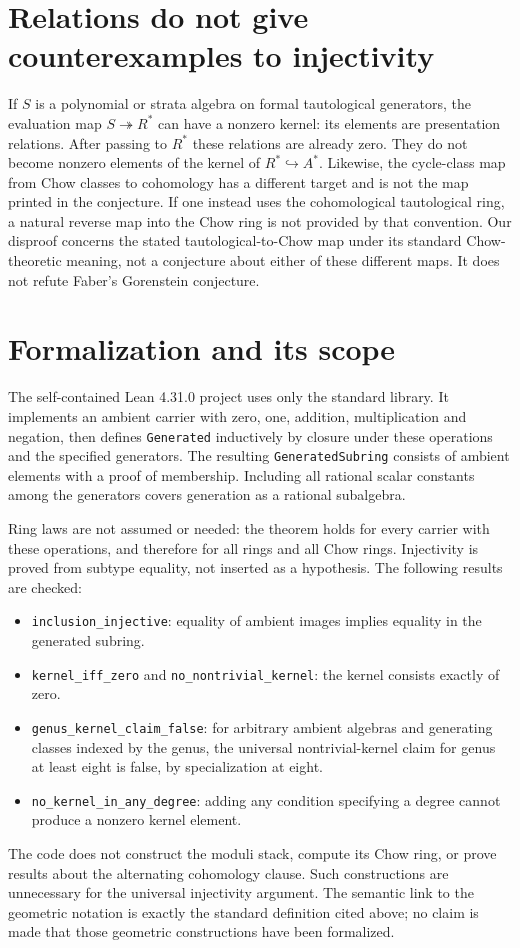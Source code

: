 \documentclass[11pt]{article}
\begin{document}
\section{Relations do not give counterexamples to injectivity}
If $S$ is a polynomial or strata algebra on formal tautological generators, the evaluation map $S\twoheadrightarrow R^*$ can have a nonzero kernel: its elements are presentation relations. After passing to $R^*$ these relations are already zero. They do not become nonzero elements of the kernel of $R^*\hookrightarrow A^*$.
Likewise, the cycle-class map from Chow classes to cohomology has a different target and is not the map printed in the conjecture. If one instead uses the cohomological tautological ring, a natural reverse map into the Chow ring is not provided by that convention. Our disproof concerns the stated tautological-to-Chow map under its standard Chow-theoretic meaning, not a conjecture about either of these different maps. It does not refute Faber's Gorenstein conjecture.

\section{Formalization and its scope}
The self-contained Lean 4.31.0 project uses only the standard library. It implements an ambient carrier with zero, one, addition, multiplication and negation, then defines \texttt{Generated} inductively by closure under these operations and the specified generators. The resulting \texttt{GeneratedSubring} consists of ambient elements with a proof of membership. Including all rational scalar constants among the generators covers generation as a rational subalgebra.

Ring laws are not assumed or needed: the theorem holds for every carrier with these operations, and therefore for all rings and all Chow rings. Injectivity is proved from subtype equality, not inserted as a hypothesis. The following results are checked:
\begin{itemize}
\item \texttt{inclusion\_injective}: equality of ambient images implies equality in the generated subring.
\item \texttt{kernel\_iff\_zero} and \texttt{no\_nontrivial\_kernel}: the kernel consists exactly of zero.
\item \texttt{genus\_kernel\_claim\_false}: for arbitrary ambient algebras and generating classes indexed by the genus, the universal nontrivial-kernel claim for genus at least eight is false, by specialization at eight.
\item \texttt{no\_kernel\_in\_any\_degree}: adding any condition specifying a degree cannot produce a nonzero kernel element.
\end{itemize}
The code does not construct the moduli stack, compute its Chow ring, or prove results about the alternating cohomology clause. Such constructions are unnecessary for the universal injectivity argument. The semantic link to the geometric notation is exactly the standard definition cited above; no claim is made that those geometric constructions have been formalized.
\end{document}
